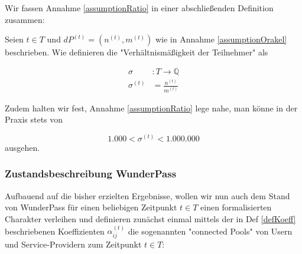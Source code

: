 \vspace{0.3cm}

Wir fassen Annahme \ref{assumptionRatio} in einer abschließenden Definition zusammen:

\vspace{0.3cm}

\begin{Def}\label{defZiel}

Seien $t \in T$ und $dP^{(t)} = \left(n^{(t)}, m^{(t)}\right)$ wie in Annahme \ref{assumptionOrakel} beschrieben. Wie definieren die "Verhältnismäßigkeit der Teilnehmer" als

\begin{align*}
\sigma &: T \rightarrow \mathbb{Q} \\
\sigma^{(t)} &= \frac{n^{(t)}}{m^{(t)}}
\end{align*}

\vspace{0.3cm}

Zudem halten wir fest, Annahme \ref{assumptionRatio} lege nahe, man könne in der Praxis stets von

\begin{equation*}
1.000 < \sigma^{(t)} < 1.000.000
\end{equation*}
ausgehen.

\end{Def}


\vspace{0.6cm}



\subsubsection{Zustandsbeschreibung WunderPass}
\label{sec:eco_zahlen_zustand_wp}

Aufbauend auf die bisher erzielten Ergebnisse, wollen wir nun auch dem Stand von WunderPass für einen beliebigen Zeitpunkt $t \in T$ einen formalisierten Charakter verleihen und definieren zunächst einmal mittels der in Def \ref{defKoeff} beschriebenen Koeffizienten $\alpha^{(t)}_{ij}$ die sogenannten "connected Pools" von Usern und Service-Providern zum Zeitpunkt $t \in T$:

\vspace{0.3cm}

